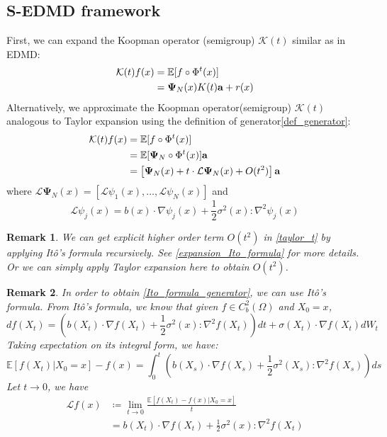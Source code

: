 \documentclass{article}[11]
\newtheorem*{remark}{Remark}
\begin{document}
	\subsection*{S-EDMD framework}
	First, we can expand the Koopman operator (semigroup) $\mathcal{K}(t)$ similar as in EDMD:
	\begin{align}\label{edmd_expansion}
		\mathcal{K}(t) f(x) 
		&= \mathbb{E}[f\circ\Phi^{t}(x)] \notag\\
		&= \mathbf{\Psi}_N(x)K(t)\mathbf{a} + r(x) 
	\end{align}
	Alternatively, we approximate the Koopman operator(semigroup) $\mathcal{K}(t)$ analogous to Taylor expansion using the definition of generator\eqref{def_generator}:
	\begin{align}\label{taylor_t}
		\mathcal{K}(t)f(x) &= \mathbb{E}[f\circ\Phi^{t}(x)] \notag\\
		&= \mathbb{E}[\mathbf{\Psi}_N\circ\Phi^{t}(x)]\mathbf{a} \notag\\
		&= \left[ \mathbf{\Psi}_N(x) + t \cdot \mathcal{L}\mathbf{\Psi}_N(x) + O(t^2)  \right]\mathbf{a}
	\end{align}
	where $\mathcal{L}\mathbf{\Psi}_N(x) = \left[ \mathcal{L}\psi_1(x), \dots, \mathcal{L}\psi_N(x) \right]$ and
	\begin{equation}\label{Ito_formula_generator}
		\mathcal{L}\psi_j(x) = b(x)\cdot \nabla\psi_j(x) + \frac{1}{2}\sigma^2(x)\colon \nabla^2 \psi_j(x)
	\end{equation}
	\begin{remark}
		We can get explicit higher order term $O(t^2)$ in \eqref{taylor_t} by applying It\^{o}'s formula recursively. See \ref{expansion_Ito_formula} for more details. Or we can simply apply Taylor expansion here to obtain $O(t^2)$.
	\end{remark}
	\begin{remark}
		In order to obtain \eqref{Ito_formula_generator}, we can use It\^{o}'s formula. From It\^{o}'s formula, we know that given $f\in C_b^2(\Omega)$ and $X_0=x$,
		$$ df(X_t) = \left(b(X_t)\cdot \nabla f(X_t) + \frac{1}{2}\sigma^2(x)\colon \nabla^2 f(X_t)\right)dt + \sigma(X_t)\cdot \nabla f(X_t)dW_t $$
		Taking expectation on its integral form, we have: 
		$$\mathbb{E}[f(X_t)|X_0=x]-f(x) = \int_0^t \left( b(X_s)\cdot \nabla f(X_s) + \frac{1}{2}\sigma^2(X_s)\colon \nabla^2 f(X_s) \right) ds$$
		Let $t \to 0$, we have
		\begin{align*}
			\mathcal{L}f(x) &\coloneqq \lim_{t \to 0} \frac{\mathbb{E}[f(X_t)-f(x)|X_0=x]}{t} \\
			&= b(X_t)\cdot \nabla f(X_t) + \frac{1}{2}\sigma^2(x)\colon \nabla^2 f(X_t)
		\end{align*}
	\end{remark}
\end{document}
